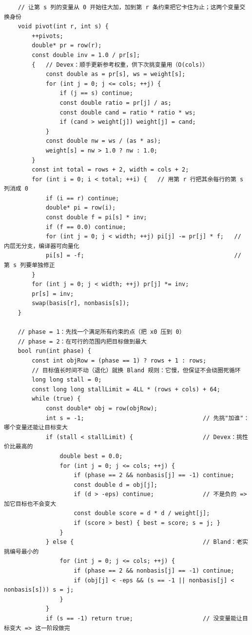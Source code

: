 \begin{verbatim}
    // 让第 s 列的变量从 0 开始往大加，加到第 r 条约束把它卡住为止；这两个变量交换身份
    void pivot(int r, int s) {
        ++pivots;
        double* pr = row(r);
        const double inv = 1.0 / pr[s];
        {   // Devex：顺手更新参考权重，供下次挑变量用（O(cols)）
            const double as = pr[s], ws = weight[s];
            for (int j = 0; j <= cols; ++j) {
                if (j == s) continue;
                const double ratio = pr[j] / as;
                const double cand = ratio * ratio * ws;
                if (cand > weight[j]) weight[j] = cand;
            }
            const double nw = ws / (as * as);
            weight[s] = nw > 1.0 ? nw : 1.0;
        }
        const int total = rows + 2, width = cols + 2;
        for (int i = 0; i < total; ++i) {   // 用第 r 行把其余每行的第 s 列消成 0
            if (i == r) continue;
            double* pi = row(i);
            const double f = pi[s] * inv;
            if (f == 0.0) continue;
            for (int j = 0; j < width; ++j) pi[j] -= pr[j] * f;   // 内层无分支，编译器可向量化
            pi[s] = -f;                                           // 第 s 列要单独修正
        }
        for (int j = 0; j < width; ++j) pr[j] *= inv;
        pr[s] = inv;
        swap(basis[r], nonbasis[s]);
    }

    // phase = 1：先找一个满足所有约束的点（把 x0 压到 0）
    // phase = 2：在可行的范围内把目标做到最大
    bool run(int phase) {
        const int objRow = (phase == 1) ? rows + 1 : rows;
        // 目标值长时间不动（退化）就换 Bland 规则：它慢，但保证不会绕圈死循环
        long long stall = 0;
        const long long stallLimit = 4LL * (rows + cols) + 64;
        while (true) {
            const double* obj = row(objRow);
            int s = -1;                                  // 先挑"加谁"：哪个变量还能让目标变大
            if (stall < stallLimit) {                    // Devex：挑性价比最高的
                double best = 0.0;
                for (int j = 0; j <= cols; ++j) {
                    if (phase == 2 && nonbasis[j] == -1) continue;
                    const double d = obj[j];
                    if (d > -eps) continue;              // 不是负的 => 加它目标也不会变大
                    const double score = d * d / weight[j];
                    if (score > best) { best = score; s = j; }
                }
            } else {                                     // Bland：老实挑编号最小的
                for (int j = 0; j <= cols; ++j) {
                    if (phase == 2 && nonbasis[j] == -1) continue;
                    if (obj[j] < -eps && (s == -1 || nonbasis[j] < nonbasis[s])) s = j;
                }
            }
            if (s == -1) return true;                    // 没变量能让目标变大 => 这一阶段做完


\end{verbatim}
